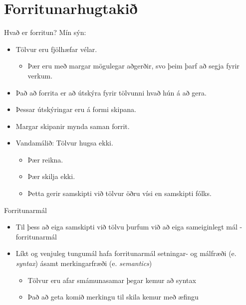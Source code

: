 \documentclass[handout]{beamer}
\begin{document}
\section{Forritunarhugtakið}

\begin{frame}{Hvað er forritun?}
\pause
Mín sýn:
\begin{itemize}
  \item Tölvur eru fjölhæfar vélar.
  \begin{itemize}
   \item Þær eru með margar mögulegar aðgerðir, svo þeim þarf að segja fyrir verkum.
  \end{itemize}
  \item Það að forrita er að útskýra fyrir tölvunni hvað hún á að gera.
  \item Þessar útskýringar eru á formi skipana.
  \item Margar skipanir mynda saman forrit.
  \item Vandamálið: Tölvur hugsa ekki.
  \begin{itemize}
   \item Þær reikna.
   \item Þær skilja ekki.
   \item Þetta gerir samskipti við tölvur öðru vísi en samskipti fólks.
  \end{itemize}
 \end{itemize}
\end{frame}

\begin{frame}{Forritunarmál}
\begin{itemize}
 \item Til þess að eiga samskipti við tölvu þurfum við að eiga sameiginlegt mál - forritunarmál
 \item Líkt og venjuleg tungumál hafa forritunarmál setningar- og málfræði (e. \emph{syntax}) ásamt merkingarfræði (e. \emph{semantics})
 \begin{itemize}
  \item Tölvur eru afar smámunasamar þegar kemur að syntax
  \item Það að geta komið merkingu til skila kemur með æfingu
 \end{itemize}
\end{itemize}
\end{frame}
\end{document}
